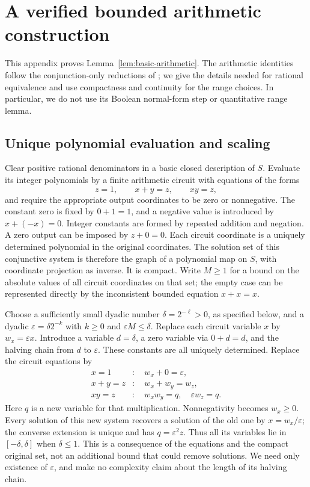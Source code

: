\section{A verified bounded arithmetic construction}
\label{app:arithmetic}

This appendix proves Lemma~\ref{lem:basic-arithmetic}. The arithmetic
identities follow the conjunction-only reductions of
\citet[Lemmas C--G and Figures 2--3]{AbrahamsenMiltzow2019}; we give the
details needed for rational equivalence and use compactness and continuity
for the range choices. In particular, we do not use its Boolean
normal-form step or quantitative range lemma.

\subsection{Unique polynomial evaluation and scaling}

Clear positive rational denominators in a basic closed description of
$S$. Evaluate its integer polynomials by a finite arithmetic circuit with
equations of the forms
\[
 z=1,\qquad x+y=z,\qquad xy=z,
\]
and require the appropriate output coordinates to be zero or nonnegative.
The constant zero is fixed by $0+1=1$, and a negative value is introduced
by $x+(-x)=0$. Integer constants are formed by repeated addition and
negation. A zero output can be imposed by $z+0=0$.
Each circuit coordinate is a uniquely determined polynomial in the
original coordinates. The solution set of this conjunctive system is
therefore the graph of a polynomial map on $S$, with coordinate projection
as inverse. It is compact. Write $M\ge1$ for a bound on the absolute
values of all circuit coordinates on that set; the empty case can be
represented directly by the inconsistent bounded equation $x+x=x$.

Choose a sufficiently small dyadic number $\delta=2^{-\ell}>0$, as
specified below, and a dyadic $\varepsilon=\delta 2^{-k}$ with
$k\ge0$ and $\varepsilon M\le\delta$. Replace each circuit variable
$x$ by $w_x=\varepsilon x$. Introduce a variable $d=\delta$, a zero
variable via $0+d=d$, and the halving chain from $d$ to $\varepsilon$.
These constants are all uniquely determined. Replace the circuit equations by
\begin{align*}
 x=1&:\quad w_x+0=\varepsilon,\\
 x+y=z&:\quad w_x+w_y=w_z,\\
 xy=z&:\quad w_xw_y=q,\quad \varepsilon w_z=q.
\end{align*}
Here $q$ is a new variable for that multiplication. Nonnegativity becomes
$w_x\ge0$. Every solution of this new system recovers a solution of the
old one by $x=w_x/\varepsilon$; the converse extension is unique and
has $q=\varepsilon^2z$. Thus all its variables lie in $[-\delta,\delta]$
when $\delta\le1$. This is a consequence of the equations and the
compact original set, not an additional bound that could remove solutions.
We need only existence of $\varepsilon$, and make no complexity claim
about the length of its halving chain.

